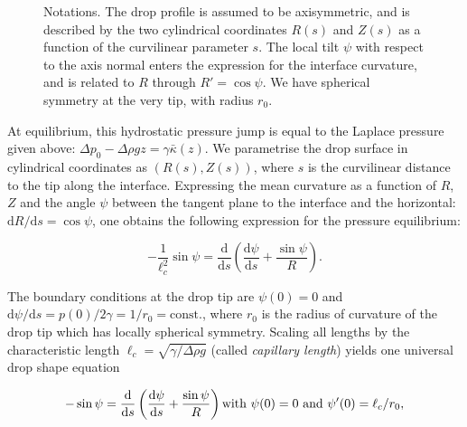 \documentclass[fleqn]{scrartcl}
\newcommand{\ud}{\mathrm{d}}%
\newcommand{\grid}[2]{%
  \draw[step=0.1cm,gray,ultra thin] (-#1,-#2) grid (#1,#2);%
  \draw[step=0.5cm,gray,thin] (-#1,-#2) grid (#1,#2);%
  \draw[thick] (-#1,0) -- (#1,0);
  \draw[thick] (0,-#2) -- (0,#2);
}
\begin{document}
\begin{figure}
  \begin{captionbeside}{Notations. The drop profile is assumed to be
      axisymmetric, and is described by the two cylindrical coordinates
      $R(s)$ and $Z(s)$ as a function of the curvilinear parameter
      $s$. The local tilt $\psi$ with respect to the axis normal
      enters the expression for the interface curvature, and is
      related to $R$ through $R' = \cos\psi$. We have spherical
      symmetry at the very tip, with radius $r_0$.}
\end{captionbeside}
\label{fig:notations}
\end{figure}

At equilibrium, this hydrostatic pressure jump is equal to the Laplace
pressure given above: $\Delta\! p_0 - \Delta\!\rho g z = \gamma
\bar\kappa(z)$. We parametrise the drop surface in cylindrical
coordinates as $(R(s), Z(s))$, where $s$ is the curvilinear distance
to the tip along the interface. Expressing the mean curvature as a
function of $R$, $Z$ and the angle $\psi$ between the tangent plane to
the interface and the horizontal: $\ud R/\ud s = \cos\psi$, one obtains
the following expression for the pressure equilibrium:

\[\label{eq:shape}
  - \frac{1}{\ell_c^2} \sin\psi =
  \frac{\ud}{\ud s}\left( \frac{\ud\psi}{\ud s} + \frac{\sin\psi}{R} \right).
\]

 The boundary conditions at the drop tip are $\psi(0)=0$ and $\ud\psi
/ \ud s = p(0)/2\gamma = 1/r_0 = \mathrm{const.}$, where $r_0$ is the
radius of curvature of the drop tip which has locally spherical
symmetry. Scaling all lengths by the characteristic length $\ell_c =
\sqrt{\gamma/\Delta\!\rho g}$ (called \emph{capillary length}) yields
one universal drop shape equation

\begin{equation}\label{eq:shapeNonDim}
  - \sin\psi =
  \frac{\ud}{\ud s}\left( \frac{\ud\psi}{\ud s} + \frac{\sin\psi}{R} \right)\\
  \mbox{with } \psi(0)=0 \mbox{ and } \psi'(0) = \ell_c/r_0,
\end{equation}
\end{document}
